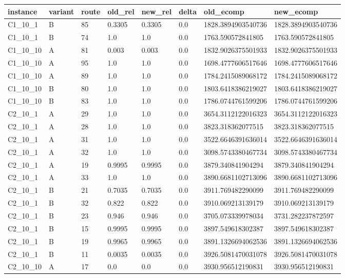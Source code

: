 \begin{tabular}{llllllll}
 \hline
 instance & variant & route & old\_rel & new\_rel & delta & old\_ecomp & new\_ecomp \\
 \hline
 C1\_10\_1 & B & 85 & 0.3305 & 0.3305 & 0.0 & 1828.3894903540736 & 1828.3894903540736 \\
 C1\_10\_1 & B & 74 & 1.0 & 1.0 & 0.0 & 1763.590572841805 & 1763.590572841805 \\
 C1\_10\_10 & A & 81 & 0.003 & 0.003 & 0.0 & 1832.9026375501933 & 1832.9026375501933 \\
 C1\_10\_10 & A & 95 & 1.0 & 1.0 & 0.0 & 1698.4777606517646 & 1698.4777606517646 \\
 C1\_10\_10 & A & 89 & 1.0 & 1.0 & 0.0 & 1784.2415089068172 & 1784.2415089068172 \\
 C1\_10\_10 & B & 80 & 1.0 & 1.0 & 0.0 & 1803.6418386219027 & 1803.6418386219027 \\
 C1\_10\_10 & B & 83 & 1.0 & 1.0 & 0.0 & 1786.0744761599206 & 1786.0744761599206 \\
 C2\_10\_1 & A & 29 & 1.0 & 1.0 & 0.0 & 3654.3112122016323 & 3654.3112122016323 \\
 C2\_10\_1 & A & 28 & 1.0 & 1.0 & 0.0 & 3823.318362077515 & 3823.318362077515 \\
 C2\_10\_1 & A & 31 & 1.0 & 1.0 & 0.0 & 3522.6646391636014 & 3522.6646391636014 \\
 C2\_10\_1 & A & 32 & 1.0 & 1.0 & 0.0 & 3098.5743380467734 & 3098.5743380467734 \\
 C2\_10\_1 & A & 19 & 0.9995 & 0.9995 & 0.0 & 3879.340841904294 & 3879.340841904294 \\
 C2\_10\_1 & A & 33 & 1.0 & 1.0 & 0.0 & 3890.6681102713096 & 3890.6681102713096 \\
 C2\_10\_1 & B & 21 & 0.7035 & 0.7035 & 0.0 & 3911.769482290099 & 3911.769482290099 \\
 C2\_10\_1 & B & 32 & 0.822 & 0.822 & 0.0 & 3910.069213139179 & 3910.069213139179 \\
 C2\_10\_1 & B & 23 & 0.946 & 0.946 & 0.0 & 3705.073339978034 & 3731.282237872597 \\
 C2\_10\_1 & B & 15 & 0.9995 & 0.9995 & 0.0 & 3897.549618302387 & 3897.549618302387 \\
 C2\_10\_1 & B & 19 & 0.9965 & 0.9965 & 0.0 & 3891.1326694062536 & 3891.1326694062536 \\
 C2\_10\_1 & B & 11 & 0.0035 & 0.0035 & 0.0 & 3926.5081470031078 & 3926.5081470031078 \\
 C2\_10\_10 & A & 17 & 0.0 & 0.0 & 0.0 & 3930.956512190831 & 3930.956512190831 \\

\end{tabular}
